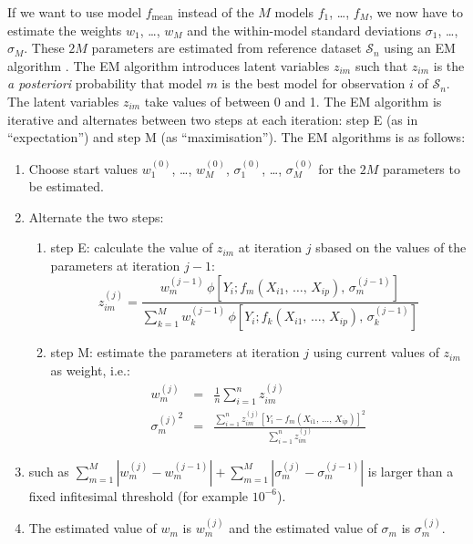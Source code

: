 If we want to use model $f_{\mathrm{mean}}$ instead of the $M$ models $f_1$, \ldots, $f_M$, we now have to estimate the weights
$w_1$, \ldots, $w_M$ and the within-model standard deviations $\sigma_1$,
\ldots, $\sigma_M$. These $2M$ parameters are estimated from reference dataset $\mathcal{S}_n$ using an EM algorithm \citep{dempster77,mclachlan08}. The EM algorithm introduces latent variables $z_{im}$ such that $z_{im}$ is the \textit{a posteriori} probability that model $m$ is the best model for observation $i$ of $\mathcal{S}_n$. The latent variables $z_{im}$ take values of between 0 and 1.
The EM algorithm is iterative and alternates between two steps at each iteration: step E (as in ``expectation'') and step M (as ``maximisation''). The EM algorithms is as follows:
\begin{enumerate}
\item Choose start values $w^{(0)}_1$, \ldots, $w^{(0)}_M$,
$\sigma^{(0)}_1$, \ldots, $\sigma^{(0)}_M$ for the $2M$ parameters to be estimated.
\item Alternate the two steps:
    \begin{enumerate}
    \item step E: calculate the value of $z_{im}$ at iteration 
    $j$ sbased on the values of the parameters at iteration $j-1$:
    \[
    z_{im}^{(j)}=\frac{w_m^{(j-1)}\,\phi[Y_i;f_m(X_{i1},\,\ldots,\,X_{ip}),
    \,\sigma_m^{(j-1)}]}{\sum_{k=1}^Mw_k^{(j-1)}\,\phi[Y_i;f_k(X_{i1},\,\ldots,\,X_{ip}),
    \,\sigma_k^{(j-1)}]}
    \]
    \item step M: estimate the parameters at iteration $j$ using current values of $z_{im}$ as weight, i.e.:
    \begin{eqnarray*}
    w_m^{(j)} &=& \frac{1}{n}\sum_{i=1}^nz_{im}^{(j)}\\ %
    {\sigma_m^{(j)}}^2 &=&
    \frac{\sum_{i=1}^nz_{im}^{(j)}[Y_i-f_m(X_{i1},\,\ldots,\,X_{ip})]^2}
    {\sum_{i=1}^nz_{im}^{(j)}}
    \end{eqnarray*}
    \end{enumerate}
\item[] such as $\sum_{m=1}^M|w_m^{(j)}-w_m^{(j-1)}|+
\sum_{m=1}^M|\sigma_m^{(j)}-\sigma_m^{(j-1)}|$ is larger than a fixed infitesimal threshold (for example $10^{-6}$).
\item The estimated value of $w_m$ is $w_m^{(j)}$ and the estimated value of $\sigma_m$ is $\sigma_m^{(j)}$.
\end{enumerate}
